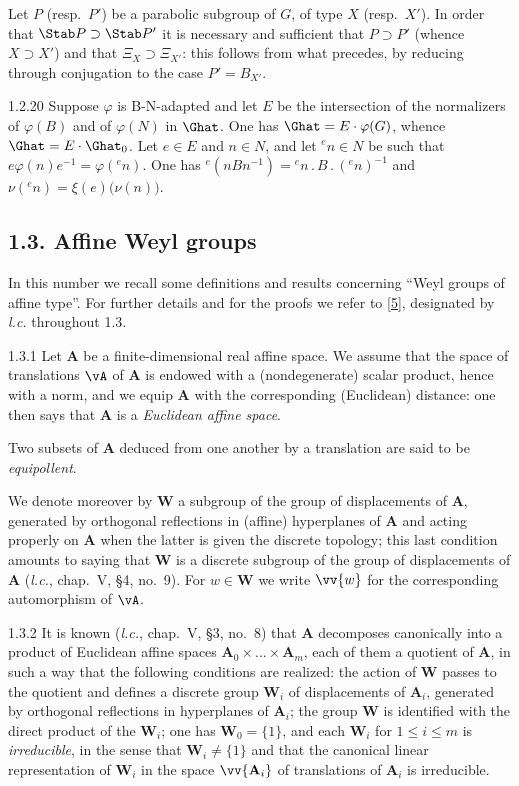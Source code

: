 \documentclass[12pt,a4paper,oneside,english]{smfart}
\makeatletter
\newcommand{\btanchor}[1]{\leavevmode\Hy@raisedlink{\hypertarget{bt:#1}{}}}
\newcommand{\btbib}[1]{\hyperlink{bib:#1}{#1}}
\newcommand{\btsecB}[2]{%
  \par\needspace{4\baselineskip}\phantomsection
  \subsection*{#2}%
  \ifx\relax#1\relax\else\btanchor{#1}\fi}
\theoremstyle{definition}
\theoremstyle{bt}
\makeatother
\begin{document}
Let $P$ (resp.\ $P'$) be a parabolic subgroup of $G$, of type $X$ (resp.\ $X'$). In order that $\Stab P\supset\Stab P'$ it is necessary and sufficient that $P\supset P'$ (whence $X\supset X'$) and that $\Xi_X\supset\Xi_{X'}$: this follows from what precedes, by reducing through conjugation to the case $P'=B_{X'}$.

\num{1.2.20}\btanchor{1.2.20} Suppose $\varphi$ is B-N-adapted and let $E$ be the intersection
of the normalizers of $\varphi(B)$ and of $\varphi(N)$ in $\Ghat$. One has $\Ghat=E\cdot\varphi(G)$, whence $\Ghat=E\cdot\Ghat_0$. Let $e\in E$ and $n\in N$, and let $^{e}n\in N$ be such that $e\varphi(n)e^{-1}=\varphi(^{e}n)$. One has $^{e}(nBn^{-1})={}^{e}n\,.\,B\,.\,(^{e}n)^{-1}$ and $\nu(^{e}n)=\xi(e)\bigl(\nu(n)\bigr)$.

\btsecB{1.3}{1.3. Affine Weyl groups}

In this number we recall some definitions and results concerning ``Weyl groups of affine type''. For further details and for the proofs we refer to [\btbib{5}], designated by \emph{l.c.} throughout 1.3.

\num{1.3.1}\btanchor{1.3.1} Let $\mathbf{A}$ be a finite-dimensional real affine space. We
assume that the space of translations $\vA$ of $\mathbf{A}$ is endowed with a (nondegenerate) scalar product, hence with a norm, and we equip $\mathbf{A}$ with the corresponding (Euclidean) distance: one then says that $\mathbf{A}$ is a \emph{Euclidean affine space}.

Two subsets of $\mathbf{A}$ deduced from one another by a translation are said to be \emph{equipollent}.

We denote moreover by $\mathbf{W}$ a subgroup of the group of displacements of $\mathbf{A}$, generated by orthogonal reflections in (affine) hyperplanes of $\mathbf{A}$ and acting properly on $\mathbf{A}$ when the latter is given the discrete topology; this last condition amounts to saying that $\mathbf{W}$ is a discrete subgroup of the group of displacements of $\mathbf{A}$ (\emph{l.c.}, chap.~V, \S4, no.~9). For $w\in\mathbf{W}$ we write $\vv{w}$ for the corresponding automorphism of $\vA$.

\num{1.3.2}\btanchor{1.3.2} It is known (\emph{l.c.}, chap.~V, \S3, no.~8) that $\mathbf{A}$
decomposes canonically into a product of Euclidean affine spaces $\mathbf{A}_0\times\dots\times\mathbf{A}_m$, each of them a quotient of $\mathbf{A}$, in such a way that the following conditions are realized: the action of $\mathbf{W}$ passes to the quotient and defines a discrete group $\mathbf{W}_i$ of displacements of $\mathbf{A}_i$, generated by orthogonal reflections in hyperplanes of $\mathbf{A}_i$; the group $\mathbf{W}$ is identified with the direct product of the $\mathbf{W}_i$; one has $\mathbf{W}_0=\{1\}$, and each $\mathbf{W}_i$ for $1\leqslant i\leqslant m$ is
\emph{irreducible}, in the sense that $\mathbf{W}_i\neq\{1\}$ and that the
canonical linear representation of $\mathbf{W}_i$ in the space $\vv{\mathbf{A}_i}$ of translations of $\mathbf{A}_i$ is irreducible.
\end{document}
